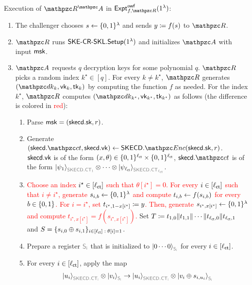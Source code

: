 \begin{description}
\item Execution of $\qR^\qA$ in
$\expa{f,\qR}{owf}(1^\secp)$:

\begin{enumerate}
\item The challenger chooses $s \leftarrow \{0,1\}^\lambda$ and sends
$y \coloneqq f(s)$ to $\qR$.

\item $\qR$ runs $\mathsf{SKE}\textrm{-}\mathsf{CR}\textrm{-}\mathsf{SKL}.\mathsf{Setup}(1^\lambda)$ and initializes $\qA$
with input $\mathsf{msk}$.

\item $\qA$ requests $q$ decryption keys for some polynomial $q$.
$\qR$ picks a random index $k^\star \in [q]$. For every $k \neq
k^\star$, $\qR$ generates $(\qdk_k, \vk_k, \tk_k)$ by computing the
function $f$ as needed. For the index $k^\star$, $\qR$ computes
$(\qdk_{k^\star}, \vk_{k^\star}, \tk_{k^\star})$ as follows (the
difference is colored in \textcolor{red}{red}):

\begin{enumerate}
\item Parse $\mathsf{msk}=(\mathsf{skecd}.\mathsf{sk}, r)$.
\item Generate
$(\skecd.\qct,\skecd.\vk)\gets\SKECD.\qEnc(\skecd.\sk,r)$.
$\mathsf{skecd}.\mathsf{vk}$ is of the form
$(x,\theta)\in\{0,1\}^{\ell_{\mathsf{ct}}}\times\{0,1\}^{\ell_{\mathsf{ct}}}$, 
$\skecd.\qct$ is of the form
$\ket{\psi_1}_{\qreg{SKECD.
CT_1}}\tensor\cdots\tensor\ket{\psi_{\ctlen}}_{\qreg{SKECD.
CT_{\ctlen}}}$.
\item \textcolor{red}{Choose an index $i^\star \in [\ell_{\mathsf{ct}}]$ such
that $\theta[i^\star] = 0$. For every $i \in [\ell_{\mathsf{ct}}]$ such
that $i \neq i^\star$, generate $s_{i,b}\leftarrow\{0,1\}^\lambda$ and compute
$t_{i,b}\leftarrow f(s_{i,b})$ for every $b\in\{0,1\}$. For $i = i^\star$,
set $t_{i^\star, 1 - x[i^\star]} \coloneqq y$. Then, generate $s_{i^\star,
x[i^\star]} \leftarrow \{0,1\}^\lambda$ and compute $t_{i^\star,
x[i^\star]} = f(s_{i^\star, x[i^\star]})$.} Set $T\coloneqq
t_{1,0}\|t_{1,1}\|\cdots\|t_{\ell_{\mathsf{ct}},0}\|t_{\ell_{\mathsf{ct}},1}$ and $S =
\{s_{i,0} \oplus s_{i, 1}\}_{i \in [\ell_{\mathsf{ct}}] \; : \;\theta[i] = 1}$.

\item Prepare a register $\qreg{S_i}$ that is initialized to
$\ket{0\cdots0}_{\qreg{S_i}}$ for every $i\in[\ell_{\mathsf{ct}}]$. 

\item For every $i\in[\ell_{\mathsf{ct}}]$, apply the map
\begin{align}
    \ket{u_i}_{\qreg{SKECD.CT_i}}\tensor\ket{v_i}_{\qreg{S_i}}
    \ra
    \ket{u_i}_{\qreg{SKECD.CT_i}}\tensor\ket{v_i\oplus
    s_{i,u_i}}_{\qreg{S_i}}
\end{align}


\end{enumerate}
\end{enumerate}
\end{description}
